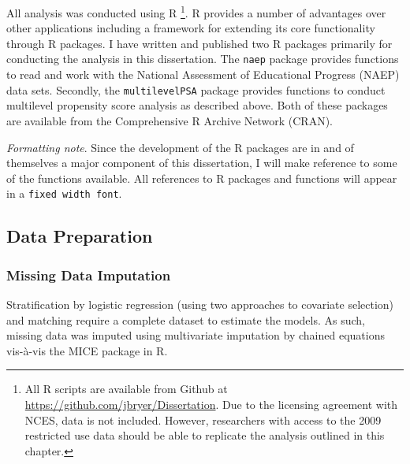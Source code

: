 \documentclass[letterpaper,12p,twoside]{article} %
\begin{document}
All analysis was conducted using R \cite{redevelopment}\footnote{All R scripts are available from Github at \url{https://github.com/jbryer/Dissertation}. Due to the licensing agreement with NCES, data is not included. However, researchers with access to the 2009 restricted use data should be able to replicate the analysis outlined in this chapter.}. R provides a number of advantages over other applications including a framework for extending its core functionality through R packages. I have written and published two R packages primarily for conducting the analysis in this dissertation. The \texttt{naep} package provides functions to read and work with the National Assessment of Educational Progress (NAEP) data sets. Secondly, the \texttt{multilevelPSA} package provides functions to conduct multilevel propensity score analysis as described above. Both of these packages are available from the Comprehensive R Archive Network (CRAN). 

\textit{Formatting note}. Since the development of the R packages are in and of themselves a major component of this dissertation, I will make reference to some of the functions available. All references to R packages and functions will appear in a \texttt{fixed width font}.

\subsection{Data Preparation}


\subsubsection{Missing Data Imputation}
Stratification by logistic regression (using two approaches to covariate selection) and matching require a complete dataset to estimate the models. As such, missing data was imputed using multivariate imputation by chained equations  vis-\`a-vis the MICE package  in R.



\end{document}
